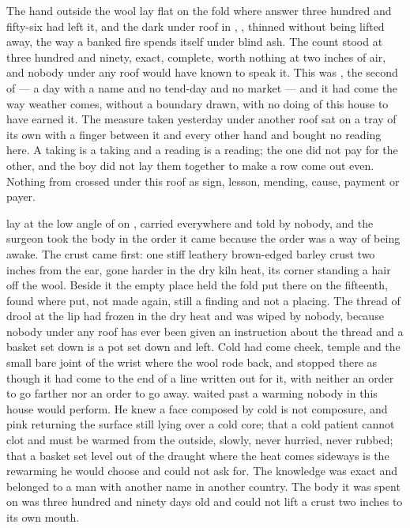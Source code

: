 
The hand outside the wool lay flat on the fold where answer three hundred and fifty-six had left it, and the dark under  roof in , ,  thinned without being lifted away, the way a banked fire spends itself under blind ash. The count stood at three hundred and ninety, exact, complete, worth nothing at two inches of air, and nobody under any roof would have known to speak it. This was , the second of  --- a day with a name and no tend-day and no market --- and it had come the way weather comes, without a boundary drawn, with no doing of this house to have earned it. The measure taken yesterday under another roof sat on a tray of its own with a finger between it and every other hand and bought no reading here. A taking is a taking and a reading is a reading; the one did not pay for the other, and the boy did not lay them together to make a row come out even. Nothing from  crossed under this roof as sign, lesson, mending, cause, payment or payer.

 lay at the low angle of  on , carried everywhere and told by nobody, and the surgeon took the body in the order it came because the order was a way of being awake. The crust came first: one stiff leathery brown-edged barley crust two inches from the ear, gone harder in the dry kiln heat, its corner standing a hair off the wool. Beside it the empty place held the fold put there on the fifteenth, found where put, not made again, still a finding and not a placing. The thread of drool at the lip had frozen in the dry heat and was wiped by nobody, because nobody under any roof has ever been given an instruction about the thread and a basket set down is a pot set down and left. Cold had come cheek, temple and the small bare joint of the wrist where the wool rode back, and stopped there as though it had come to the end of a line written out for it, with neither an order to go farther nor an order to go away.  waited past a warming nobody in this house would perform. He knew a face composed by cold is not composure, and pink returning the surface still lying over a cold core; that a cold patient cannot clot and must be warmed from the outside, slowly, never hurried, never rubbed; that a basket set level out of the draught where the heat comes sideways is the rewarming he would choose and could not ask for. The knowledge was exact and belonged to a man with another name in another country. The body it was spent on was three hundred and ninety days old and could not lift a crust two inches to its own mouth.

